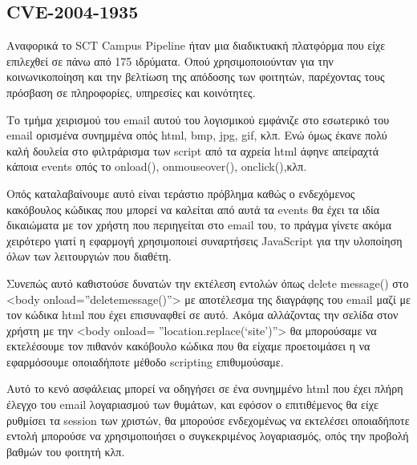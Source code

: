 \subsection{CVE-2004-1935}

\noindent
Αναφορικά το SCT Campus Pipeline ήταν μια διαδικτυακή πλατφόρμα που είχε επιλεχθεί σε πάνω από 175 ιδρύματα. Οπού χρησιμοποιούνταν για την κοινωνικοποίηση και την βελτίωση της απόδοσης των φοιτητών, παρέχοντας τους πρόσβαση σε πληροφορίες, υπηρεσίες και κοινότητες.


\noindent
Το τμήμα χειρισμού του email αυτού του λογισμικού εμφάνιζε στο εσωτερικό του email ορισμένα συνημμένα οπός html, bmp, jpg, gif, κλπ. Ενώ όμως έκανε πολύ καλή δουλεία στο φιλτράρισμα των script από τα αχρεία html άφηνε απείραχτά κάποια events οπός το onload(), onmouseover(), onclick(),κλπ. 

\noindent
Οπός καταλαβαίνουμε αυτό είναι τεράστιο πρόβλημα καθώς ο ενδεχόμενος κακόβουλος κώδικας που μπορεί να καλείται από αυτά τα events θα έχει τα ιδία δικαιώματα με τον χρήστη που περιηγείται στο email του, το πράγμα γίνετε ακόμα χειρότερο γιατί η εφαρμογή χρησιμοποιεί συναρτήσεις JavaScript για την υλοποίηση όλων των λειτουργιών που διαθέτη. 

\noindent
Συνεπώς αυτό καθιστούσε δυνατών την εκτέλεση εντολών όπως delete message() στο <body onload=”deletemessage()”> με αποτέλεσμα της διαγράφης του email μαζί με τον κώδικα html που έχει επισυναφθεί σε αυτό. Ακόμα αλλάζοντας την σελίδα στον χρήστη με την <body onload= ”location.replace(‘site’)”> θα μπορούσαμε να εκτελέσουμε τον πιθανόν κακόβουλο κώδικα που  θα είχαμε προετοιμάσει η να εφαρμόσουμε οποιαδήποτε μέθοδο scripting επιθυμούσαμε.

\noindent
Αυτό το κενό ασφάλειας μπορεί να οδηγήσει σε ένα συνημμένο html που έχει πλήρη έλεγχο του email λογαριασμού των θυμάτων, και εφόσον ο επιτιθέμενος θα είχε ρυθμίσει τα session των χριστών, θα μπορούσε ενδεχομένως να εκτελέσει οποιαδήποτε εντολή μπορούσε να χρησιμοποιήσει ο συγκεκριμένος λογαριασμός, οπός την προβολή βαθμών του φοιτητή κλπ.

